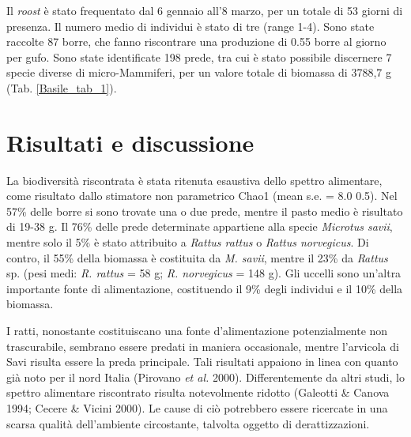 Il \textit{roost} \`e stato frequentato dal 6 gennaio
all{\textquoteright}8 marzo, per un totale di 53 giorni di presenza. Il
numero medio di individui \`e stato di tre (range 1-4). Sono state
raccolte 87 borre, che fanno riscontrare una produzione di 0.55 borre
al giorno per gufo. Sono state identificate 198 prede, tra cui \`e
stato possibile discernere 7 specie diverse di micro-Mammiferi, per un
valore totale di biomassa di 3788,7 g (Tab. \ref{Basile_tab_1}). 

\section*{Risultati e discussione}

La biodiversit\`a riscontrata \`e stata ritenuta esaustiva dello spettro
alimentare, come risultato dallo stimatore non parametrico Chao1 (mean
{\textpm} s.e. = 8.0 {\textpm} 0.5). Nel 57\% delle borre si sono
trovate una o due prede, mentre il pasto medio \`e risultato di 19-38
g. Il 76\% delle prede determinate appartiene alla specie
\textit{Microtus savii}, mentre solo il 5\% \`e stato attribuito a
\textit{Rattus rattus} o \textit{Rattus norvegicus}. Di contro, il 55\%
della biomassa \`e costituita da \textit{M. savii}, mentre il 23\% da
\textit{Rattus} sp. (pesi medi: \textit{R. rattus} = 58 g; \textit{R.
norvegicus} = 148 g). Gli uccelli sono un{\textquoteright}altra
importante fonte di alimentazione, costituendo il 9\% degli individui e
il 10\% della biomassa.

I ratti, nonostante costituiscano una fonte
d{\textquoteright}alimentazione potenzialmente non trascurabile,
sembrano essere predati in maniera occasionale, mentre
l{\textquoteright}arvicola di Savi risulta essere la preda principale.
Tali risultati appaiono in linea con quanto gi\`a noto per il nord
Italia (Pirovano \textit{et al.} 2000). Differentemente da altri studi,
lo spettro alimentare riscontrato risulta notevolmente ridotto
(Galeotti \& Canova 1994; Cecere \& Vicini 2000). Le cause di ci\`o
potrebbero essere ricercate in una scarsa qualit\`a
dell{\textquoteright}ambiente circostante, talvolta oggetto di
derattizzazioni. 

